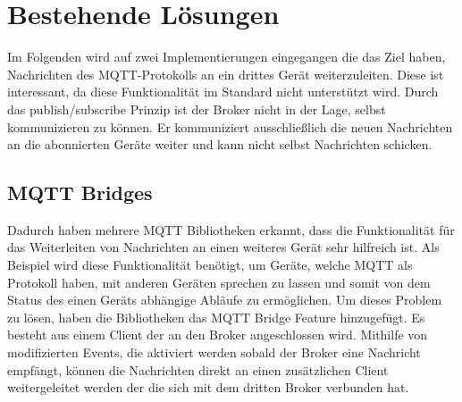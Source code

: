 
\section{Bestehende Lösungen}
    Im Folgenden wird auf zwei Implementierungen eingegangen die das Ziel haben, Nachrichten des \ac{MQTT}-Protokolls an ein drittes Gerät weiterzuleiten.
    Diese ist interessant, da diese Funktionalität im Standard \cite{gupta_banks_2015} nicht unterstützt wird. Durch das publish/subscribe Prinzip ist der Broker nicht in der Lage, selbst kommunizieren zu können. Er kommuniziert ausschließlich die neuen Nachrichten an die abonnierten Geräte weiter und kann nicht selbst Nachrichten schicken.
    
    \subsection{MQTT Bridges}
        Dadurch haben mehrere MQTT Bibliotheken \cite{84codes_ab_2016} \cite{light_2019} erkannt, dass die Funktionalität für das Weiterleiten von Nachrichten an einen weiteres Gerät sehr hilfreich ist. Als Beispiel wird diese Funktionalität benötigt, um Geräte, welche \ac{MQTT} als Protokoll haben, mit anderen Geräten sprechen zu lassen und somit von dem Status des einen Geräts abhängige Abläufe zu ermöglichen.
        Um dieses Problem zu lösen, haben die Bibliotheken das MQTT Bridge Feature hinzugefügt. Es besteht aus einem Client der an den Broker angeschlossen wird. Mithilfe von modifizierten Events, die aktiviert werden sobald der Broker eine Nachricht empfängt, können die Nachrichten direkt an einen zusätzlichen Client weitergeleitet werden der die sich mit dem dritten Broker verbunden hat.
    
